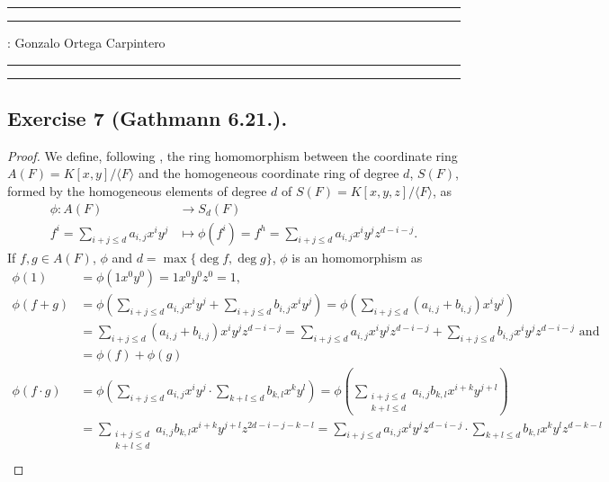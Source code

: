 \documentclass[11pt,a4paper]{article}
\begin{document}
\hrule\hrule
\vspace{1mm}


\vspace{1mm}

 : Gonzalo Ortega Carpintero
\vspace{2mm}

\hrule\hrule

\subsection*{Exercise 7 (Gathmann 6.21.).}
\begin{proof}
We define, following \cite[Construction 3.13]{gath}, the ring homomorphism between the coordinate ring $ A(F) = K[x, y] / \langle F \rangle $ and the homogeneous coordinate ring of degree $ d $, $ S(F)$, formed by the homogeneous elements of degree $ d $ of $ S(F) = K[x, y, z] / \langle F \rangle$, as
  \begin{align*}
    \phi: A(F) &\longrightarrow S_d(F) \\
    f^i = \sum_{i+j \leq d} a_{i,j} x^i y^j &\longmapsto \phi (f^i) = f^h = \sum_{i+j \leq d} a_{i,j} x^i y^j z^{d-i-j}.
  \end{align*}
  If $f, g \in A(F) $, $\phi $ and $ d = \operatorname{max}\{\operatorname{deg}f, \operatorname{deg}g\} $, $\phi$ is an homomorphism as
  \begin{align*}
    \phi(1) &= \phi(1 x^0 y^0) = 1 x^0 y^0 z^0 = 1, \\
    \phi(f + g) &= \phi \left(\sum_{i + j \leq d} a_{i,j} x^i y^j + \sum_{i + j \leq d} b_{i,j} x^i y^j \right) = \phi \left(\sum_{i + j \leq d} (a_{i,j} + b_{i,j})  x^i y^j \right) \\
    &= \sum_{i + j \leq d} (a_{i,j} + b_{i,j})  x^i y^j z^{d-i-j} = \sum_{i + j \leq d} a_{i,j}  x^i y^j z^{d-i-j} + \sum_{i + j \leq d} b_{i,j}  x^i y^j z^{d-i-j} \text{ and} \\
    &= \phi(f) + \phi(g)\\ 
    \phi(f \cdot g) &= \phi\left(\sum_{i + j \leq d} a_{i,j} x^i y^j \cdot \sum_{k + l \leq d} b_{k,l} x^k y^l\right) = \phi\left(\sum_{\substack{i + j \leq d\\k + l \leq d}} a_{i,j} b_{k,l} x^{i+k} y^{j+l} \right) \\
    &= \sum_{\substack{i + j \leq d\\k + l \leq d}} a_{i,j} b_{k,l} x^{i+k} y^{j+l} z^{2d-i-j-k-l} = \sum_{i + j \leq d} a_{i,j} x^{i} y^{j} z^{d-i-j} \cdot \sum_{k + l \leq d} b_{k,l} x^{k} y^{l} z^{d-k-l} \\

\end{align*}
\end{proof}
\end{document}
